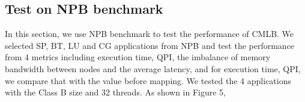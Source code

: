 \documentclass[a4paper,fleqn]{cas-sc}
\begin{document}
\subsection{Test on NPB benchmark }
In this section, we use NPB benchmark to test the performance of CMLB. We selected SP, BT, LU and CG applications from NPB and test the performance from 4 metrics including execution time, QPI, the imbalance of memory bandwidth between nodes and the average latency, and for execution time, QPI, we compare that with the value before mapping. We tested the 4 applications with the Class B size and 32 threads. As shown in Figure 5, 
\begin{figure}[htbp] 
	\centering	
\end{figure}
\end{document}
